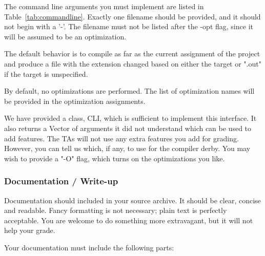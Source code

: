 The command line arguments you must implement are listed in
Table~\ref{tab:commandline}. Exactly one filename should be provided,
and it should not begin with a '-'. The filename must not be listed
after the -opt flag, since it will be assumed to be an optimization.

The default behavior is to compile as far as the current assignment of
the project and produce a file with the extension changed based on
either the target or ".out" if the target is unspecified.

By default, no optimizations are performed.  The list of optimization
names will be provided in the optimization assignments.

We have provided a class, CLI, which is sufficient to implement this
interface. It also returns a Vector of arguments it did not understand
which can be used to add features. The TAs will not use any extra
features you add for grading.  However, you can tell us which, if any,
to use for the compiler derby. You may wish to provide a "-O" flag,
which turns on the optimizations you like.


\subsubsection*{Documentation / Write-up}

Documentation should included in your source archive.  It should be
clear, concise and readable.  Fancy formatting is not necessary; plain
text is perfectly acceptable.  You are welcome to do something more
extravagant, but it will not help your grade.

Your documentation must include the following parts:


